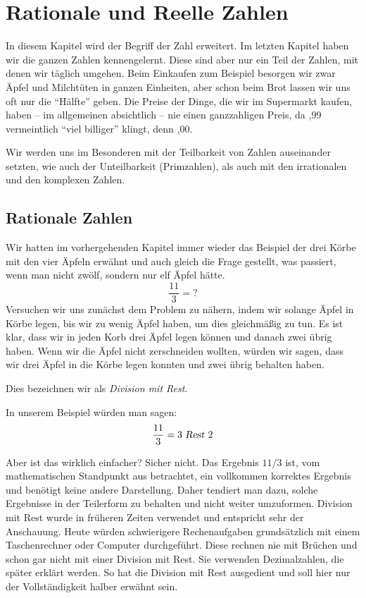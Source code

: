 

\chapter{Rationale und Reelle Zahlen}

In diesem Kapitel wird der Begriff der Zahl erweitert. Im letzten Kapitel haben wir die ganzen Zahlen kennengelernt. Diese sind aber nur ein Teil der Zahlen, mit denen wir täglich umgehen. Beim Einkaufen zum Beispiel besorgen wir zwar Äpfel und Milchtüten in ganzen Einheiten, aber schon beim Brot lassen wir uns oft nur die "`Hälfte"' geben. Die Preise der Dinge, die wir im Supermarkt kaufen, haben -- im allgemeinen absichtlich -- nie einen ganzzahligen Preis, da ,99 vermeintlich "`viel billiger"' klingt, denn ,00.

Wir werden uns im Besonderen mit der Teilbarkeit von Zahlen auseinander setzten, wie auch der Unteilbarkeit (Primzahlen), als auch mit den irrationalen und den komplexen Zahlen.

\section{Rationale Zahlen}

Wir hatten im vorhergehenden Kapitel immer wieder das Beispiel der drei Körbe mit den vier Äpfeln erwähnt und auch gleich die Frage gestellt, was passiert, wenn man nicht zwölf, sondern nur elf Äpfel hätte.
\[ \frac{11}{3} = ? \]
Versuchen wir uns zunächst dem Problem zu nähern, indem wir solange Äpfel in Körbe legen, bis wir zu wenig Äpfel haben, um dies gleichmäßig zu tun. Es ist klar, dass wir in jeden Korb drei Äpfel legen können und danach zwei übrig haben. Wenn wir die Äpfel nicht zerschneiden wollten, würden wir sagen, dass wir drei Äpfel in die Körbe legen konnten und zwei übrig behalten haben. 

\begin{definition}
Dies bezeichnen wir als \textsl{Division mit Rest}. 
\end{definition}
In unserem Beispiel würden man sagen:
\[ \frac{11}{3} = 3 \textsl{ Rest } 2 \]

Aber ist das wirklich einfacher? Sicher nicht. Das Ergebnis $11/3$ ist, vom mathematischen Standpunkt aus betrachtet, ein vollkommen korrektes Ergebnis und benötigt keine andere Darstellung. Daher tendiert man dazu, solche Ergebnisse in der Teilerform zu behalten und nicht weiter umzuformen. Division mit Rest wurde in früheren Zeiten verwendet und entspricht sehr der Anschauung. Heute würden schwierigere Rechenaufgaben grundsätzlich mit einem Taschenrechner oder Computer durchgeführt. Diese rechnen nie mit Brüchen und schon gar nicht mit einer Division mit Rest. Sie verwenden Dezimalzahlen, die später erklärt werden. So hat die Division mit Rest ausgedient und soll hier nur der Vollständigkeit halber erwähnt sein.

